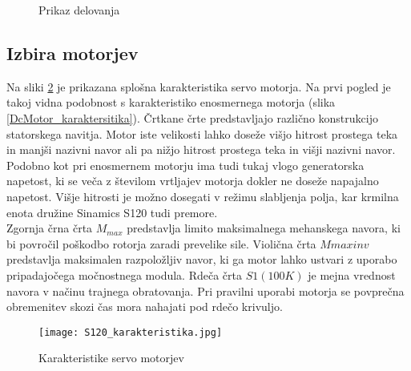 \documentclass[a4paper,twoside,openright,12pt]{book}
\begin{document}
{\begin{figure}[h]
{
	}
	\caption{\label{zaga_delovanje} Prikaz delovanja}
\end{figure}
\subsection{Izbira motorjev}
Na sliki \ref{zaga_karakteristike} je prikazana splošna karakteristika servo motorja. Na prvi pogled je takoj vidna podobnost s karakteristiko enosmernega motorja (slika \ref{DcMotor_karaktersitika}). Črtkane črte predstavljajo različno konstrukcijo statorskega navitja. Motor iste velikosti lahko doseže višjo hitrost prostega teka in manjši nazivni navor ali pa nižjo hitrost prostega teka in višji nazivni navor. Podobno kot pri enosmernem motorju ima tudi tukaj vlogo generatorska napetost, ki se veča z številom vrtljajev motorja dokler ne doseže napajalno napetost. Višje hitrosti je možno dosegati v režimu slabljenja polja, kar krmilna enota družine Sinamics S120 tudi premore.\\
Zgornja črna črta $M_{max}$ predstavlja limito maksimalnega mehanskega navora, ki bi povročil poškodbo rotorja zaradi prevelike sile. Violična črta $M{max inv}$ predstavlja maksimalen razpoložljiv navor, ki ga motor lahko ustvari z uporabo pripadajočega močnostnega modula. Rdeča črta $S1(100K)$ je mejna vrednost navora v načinu trajnega obratovanja. Pri pravilni uporabi motorja se  povprečna obremenitev skozi čas mora nahajati pod rdečo krivuljo. 
\begin{figure}[h]
	\centering
	\texttt{[image: S120\_karakteristika.jpg]}
	\caption{\label{zaga_karakteristike}Karakteristike servo motorjev}
\end{figure}

}
\end{document}
